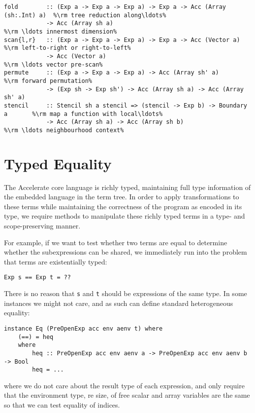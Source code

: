 \begin{lstlisting}
fold        :: (Exp a -> Exp a -> Exp a) -> Exp a -> Acc (Array (sh:.Int) a)  %\rm tree reduction along\ldots%
            -> Acc (Array sh a)                                               %\rm \ldots innermost dimension%
scan{l,r}   :: (Exp a -> Exp a -> Exp a) -> Exp a -> Acc (Vector a)           %\rm left-to-right or right-to-left%
            -> Acc (Vector a)                                                 %\rm \ldots vector pre-scan%
permute     :: (Exp a -> Exp a -> Exp a) -> Acc (Array sh' a)                 %\rm forward permutation%
            -> (Exp sh -> Exp sh') -> Acc (Array sh a) -> Acc (Array sh' a)
stencil     :: Stencil sh a stencil => (stencil -> Exp b) -> Boundary a       %\rm map a function with local\ldots%
            -> Acc (Array sh a) -> Acc (Array sh b)                           %\rm \ldots neighbourhood context%
\end{lstlisting}



\section{Typed Equality}
\label{sec:equality}

The Accelerate core language is richly typed, maintaining full type information
of the embedded language in the term tree. In order to apply transformations to
these terms while maintaining the correctness of the program as encoded in its
type, we require methods to manipulate these richly typed terms in a type- and
scope-preserving manner.

For example, if we want to test whether two terms are equal to determine whether
the subexpressions can be shared, we immediately run into the problem that terms
are existentially typed:
%
\begin{lstlisting}[style=haskell]
Exp s == Exp t = ??
\end{lstlisting}
%
There is no reason that \texttt{s} and \texttt{t} should be expressions of the
same type. In some instances we might not care, and as such can define standard
heterogeneous equality:
%
\begin{lstlisting}[style=haskell]
instance Eq (PreOpenExp acc env aenv t) where
    (==) = heq
    where
        heq :: PreOpenExp acc env aenv a -> PreOpenExp acc env aenv b -> Bool
        heq = ...
\end{lstlisting}
%
where we do not care about the result type of each expression, and only require
that the environment type, re size, of free scalar and array variables are the
same so that we can test equality of  indices.

